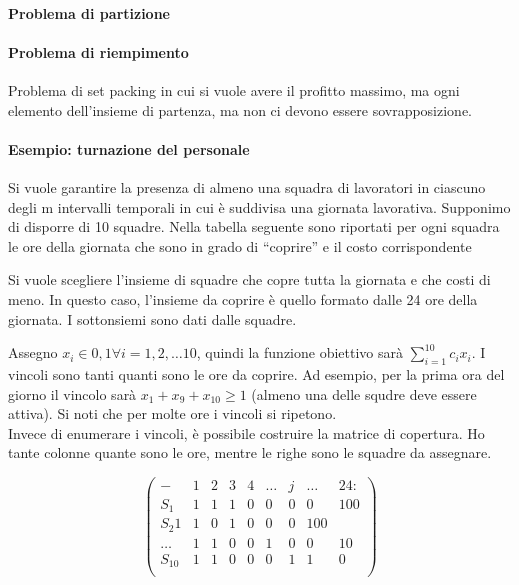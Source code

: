 \documentclass{article}
\begin{document}
\paragraph{Problema di partizione}
\paragraph{Problema di riempimento}
Problema di set packing in cui si vuole avere il profitto massimo, ma ogni elemento
dell'insieme di partenza, ma non ci devono essere sovrapposizione.

\paragraph{Esempio: turnazione del personale}
Si vuole garantire la presenza di almeno una squadra di lavoratori in ciascuno
degli m intervalli temporali in cui è suddivisa una giornata lavorativa.
Supponimo di disporre di 10 squadre. Nella tabella seguente sono riportati per ogni
squadra le ore della giornata che sono in grado di “coprire” e il costo corrispondente

Si vuole scegliere l'insieme di squadre che copre tutta la giornata e che costi 
di meno.
In questo caso, l'insieme da coprire è quello formato dalle 24 ore della 
giornata. I sottonsiemi sono dati dalle squadre.

Assegno $x_i \in {0,1} \forall i = 1,2,\ldots 10$, quindi la funzione obiettivo 
sarà $\sum_{i=1}^10 c_ix_i$. I vincoli sono tanti quanti sono le ore da coprire. 
Ad esempio, per la prima ora del giorno il vincolo sarà $x_1+x_9+x_{10} \geq 1$ 
(almeno una delle squdre deve essere attiva). Si noti che per molte ore i vincoli 
si ripetono.\\ 
Invece di enumerare i vincoli, è possibile costruire la matrice di copertura.
Ho tante colonne quante sono le ore, mentre le righe sono le squadre da assegnare.


\begin{equation*}
  \begin{pmatrix}
   - &1 & 2 & 3 & 4 & \ldots  & j & \ldots  & 24:\\
   S_1& 1 & 1 & 1 & 0 & 0 & 0 & 0 & 100\\ 
   S_2 1 & 1 & 0 & 1 & 0 & 0 & 0 & 100\\ 
   \ldots &  1 & 1 & 0 & 0 & 1 & 0 & 0 & 10\\ 
   S_{10}& 1 & 1 & 0 & 0 & 0 & 1 & 1 & 0\\ 
  \end{pmatrix}
\end{equation*}
\end{document}

